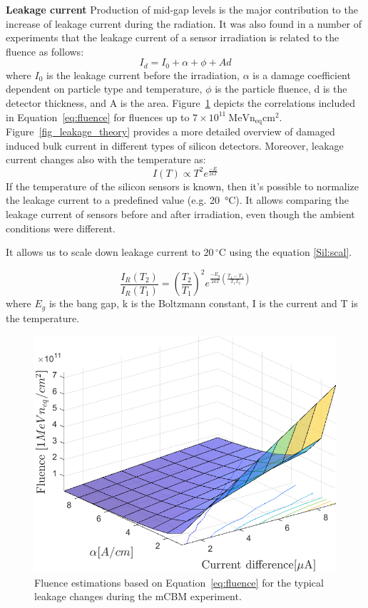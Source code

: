\textbf{Leakage current}\bigbreak
Production of mid-gap levels is the major contribution to the increase of leakage current during the radiation. It was also found in a number of experiments that the leakage current of a sensor irradiation is related to the fluence as follows:
\begin{equation}
\label{eq:fluence}
    I_{d} = I_{0} + \alpha + \phi + Ad
\end{equation}
where $I_{0}$ is the leakage current before the irradiation, $\alpha$ is a damage coefficient dependent on particle type and temperature, $\phi$ is the particle fluence, d is the detector thickness, and A is the area. Figure~\ref{fig_leakage} depicts the correlations included in Equation~\ref{eq:fluence} for fluences up to $7\times 10^{11}~\mathrm{MeVn_{eq}cm^{2}}$. Figure~\ref{fig_leakage_theory} provides a more detailed overview of damaged induced bulk current in different types of silicon detectors. Moreover, leakage current changes also with the temperature as:
\begin{equation}
\label{Sil:temp}
    I(T) \propto T^{2}e^{\frac{-E}{2kT}}
\end{equation}
If the temperature of the silicon sensors is known, then it's possible to normalize the leakage current to a predefined value (e.g. \SI{20}{\celsius}). It allows comparing the leakage current of sensors before and after irradiation, even though the ambient conditions were different. 

It allows us to scale down leakage current to $20\,^{\circ}$C using the equation \ref{Sil:scal}.
 
\begin{equation}
\label{Sil:scal}
    \frac{I_{R}(T_{2})}{I_{R}(T_{1})} = (\frac{T_{2}}{T_{1}})^{2}e^{\frac{-E_{g}}{2kT}(\frac{T_{1}-T_{2}}{T_{1}T_{2}})}
\end{equation}
where $E_{g}$ is the bang gap, k is the Boltzmann constant, I is the current and T is the temperature.
\begin{figure}[!h]
\centering
\includegraphics[width=0.65\columnwidth]{Chapter2/images/Leakage_current.png}
\caption{Fluence estimations based on Equation~\ref{eq:fluence} for the typical leakage changes during the \gls{mCBM} experiment.}
\label{fig_leakage}
\end{figure}


